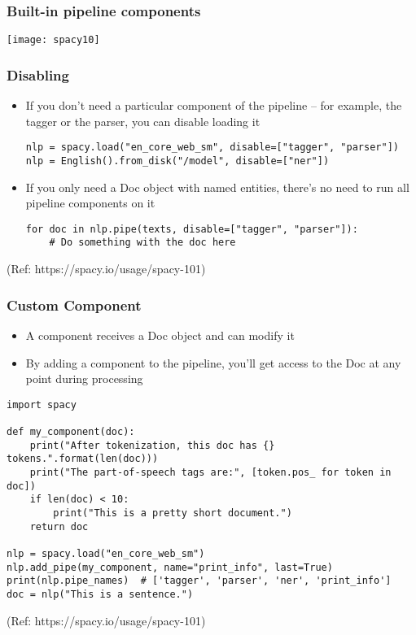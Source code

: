 \begin{frame}[fragile]\frametitle{Built-in pipeline components}
\begin{center}
\texttt{[image: spacy10]}
\end{center}

\end{frame}

\begin{frame}[fragile]\frametitle{Disabling}
  \begin{itemize}
    \item If you don’t need a particular component of the pipeline – for example, the tagger or the parser, you can disable loading it
		\begin{lstlisting}
nlp = spacy.load("en_core_web_sm", disable=["tagger", "parser"])
nlp = English().from_disk("/model", disable=["ner"])
\end{lstlisting}

\item If you only need a Doc object with named entities, there’s no need to run all pipeline components on it
		\begin{lstlisting}
for doc in nlp.pipe(texts, disable=["tagger", "parser"]):
    # Do something with the doc here
\end{lstlisting}
  \end{itemize}
	
	
{\tiny (Ref: https://spacy.io/usage/spacy-101)}
\end{frame}

\begin{frame}[fragile]\frametitle{Custom Component}
  \begin{itemize}
    \item A component receives a Doc object and can modify it


\item  By adding a component to the pipeline, you’ll get access to the Doc at any point during processing
  \end{itemize}
	
		\begin{lstlisting}
import spacy

def my_component(doc):
    print("After tokenization, this doc has {} tokens.".format(len(doc)))
    print("The part-of-speech tags are:", [token.pos_ for token in doc])
    if len(doc) < 10:
        print("This is a pretty short document.")
    return doc

nlp = spacy.load("en_core_web_sm")
nlp.add_pipe(my_component, name="print_info", last=True)
print(nlp.pipe_names)  # ['tagger', 'parser', 'ner', 'print_info']
doc = nlp("This is a sentence.")
\end{lstlisting}	
	
{\tiny (Ref: https://spacy.io/usage/spacy-101)}
\end{frame}

